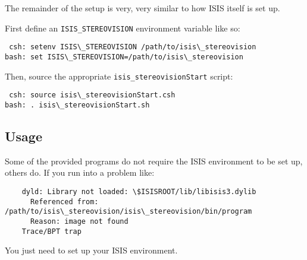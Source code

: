 The remainder of the setup is very, very similar to how ISIS itself
is set up.

First define an \texttt{ISIS\_STEREOVISION} environment variable like so:
\begin{verbatim}
 csh: setenv ISIS\_STEREOVISION /path/to/isis\_stereovision
bash: set ISIS\_STEREOVISION=/path/to/isis\_stereovision
\end{verbatim}

Then, source the appropriate \texttt{isis\_stereovisionStart} script:
\begin{verbatim}
 csh: source isis\_stereovisionStart.csh
bash: . isis\_stereovisionStart.sh
\end{verbatim}

\subsection*{Usage}

Some of the provided programs do not require the ISIS environment
to be set up, others do.  If you run into a problem like:
\begin{verbatim}
    dyld: Library not loaded: \$ISISROOT/lib/libisis3.dylib
      Referenced from: /path/to/isis\_stereovision/isis\_stereovision/bin/program
      Reason: image not found
    Trace/BPT trap
\end{verbatim}

You just need to set up your ISIS environment.

